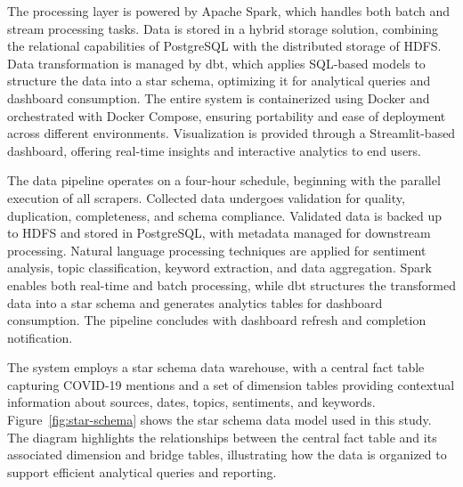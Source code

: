 \documentclass[a4paper]{article}
\theoremstyle{plain}
\theoremstyle{definition}
\begin{document}
The processing layer is powered by Apache Spark, which handles both batch and stream processing tasks. Data is stored in a hybrid storage solution, combining the relational capabilities of PostgreSQL with the distributed storage of HDFS. Data transformation is managed by dbt, which applies SQL-based models to structure the data into a star schema, optimizing it for analytical queries and dashboard consumption. The entire system is containerized using Docker and orchestrated with Docker Compose, ensuring portability and ease of deployment across different environments. Visualization is provided through a Streamlit-based dashboard, offering real-time insights and interactive analytics to end users.

The data pipeline operates on a four-hour schedule, beginning with the parallel execution of all scrapers. Collected data undergoes validation for quality, duplication, completeness, and schema compliance. Validated data is backed up to HDFS and stored in PostgreSQL, with metadata managed for downstream processing. Natural language processing techniques are applied for sentiment analysis, topic classification, keyword extraction, and data aggregation. Spark enables both real-time and batch processing, while dbt structures the transformed data into a star schema and generates analytics tables for dashboard consumption. The pipeline concludes with dashboard refresh and completion notification.

The system employs a star schema data warehouse, with a central fact table capturing COVID-19 mentions and a set of dimension tables providing contextual information about sources, dates, topics, sentiments, and keywords. Figure~\ref{fig:star-schema} shows the star schema data model used in this study. The diagram highlights the relationships between the central fact table and its associated dimension and bridge tables, illustrating how the data is organized to support efficient analytical queries and reporting.
\end{document}
